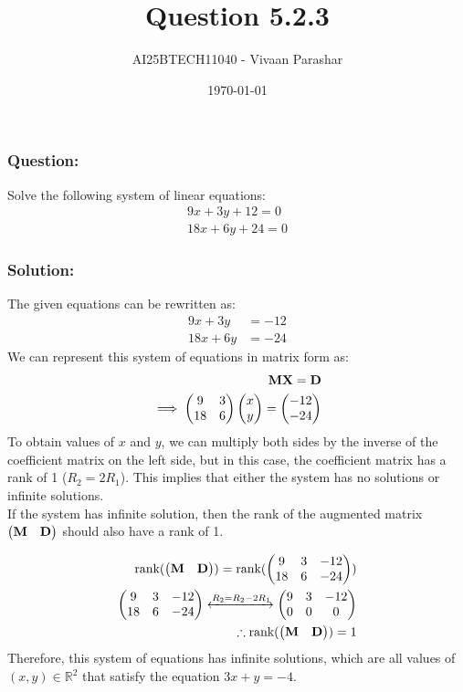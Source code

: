 \documentclass{beamer}
\title{Question 5.2.3}
\author{AI25BTECH11040 - Vivaan Parashar}
\date{\today}
\begin{document}
\frame{\titlepage}

\begin{frame}
    \frametitle{Question: }
    Solve the following system of linear equations:
    \begin{align*}
        9x + 3y + 12 = 0\\
        18x + 6y + 24 = 0
    \end{align*}
\end{frame}

\begin{frame}
    \frametitle{Solution: }
    The given equations can be rewritten as:
    \begin{align}
        9x + 3y  & = -12 \\
        18x + 6y & = -24
    \end{align}
    We can represent this system of equations in matrix form as:
    \begin{align}
        \mathbf{M}\mathbf{X} = \mathbf{D} \\
        \implies \begin{pmatrix}9 & 3    \\ 18 & 6\end{pmatrix} \begin{pmatrix}x \\ y\end{pmatrix} = \begin{pmatrix}-12 \\ -24\end{pmatrix}
    \end{align}
    To obtain values of $x$ and $y$, we can multiply both sides by the inverse of the coefficient matrix on the left side, but in this case, the coefficient matrix has a rank of 1 ($R_2 = 2R_1$). This implies that either the system has no solutions or infinite solutions.\\
    If the system has infinite solution, then the rank of the augmented matrix $\begin{pmatrix}\mathbf{M} & \mathbf{D}\end{pmatrix}$ should also have a rank of 1.
\end{frame}
\begin{frame}
    \begin{align}
        \text{rank}(\begin{pmatrix}\mathbf{M}            & \mathbf{D}\end{pmatrix}) = \text{rank}(\begin{pmatrix}9 & 3   & -12 \\ 18 & 6 & -24\end{pmatrix})\\
        \begin{pmatrix}9                        & 3                          & -12       \\ 18 & 6 & -24\end{pmatrix} \xleftrightarrow{R_2 = R_2 - 2R_1} \begin{pmatrix}9 & 3 & -12 \\ 0 & 0 & 0\end{pmatrix}\\
        \therefore \text{rank}(\begin{pmatrix}\mathbf{M} & \mathbf{D}\end{pmatrix}) = 1
    \end{align}
    Therefore, this system of equations has infinite solutions, which are all values of $(x, y) \in \mathbb{R}^2$ that satisfy the equation $3x + y = -4$.\\
\end{frame}
\end{document}

